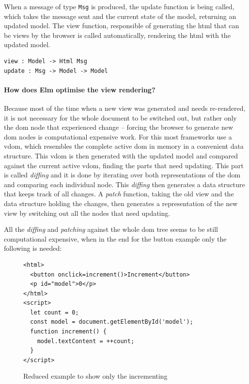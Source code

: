 When a message of type \texttt{Msg} is produced, the update function is being called, which takes the message sent and the current state of the model, returning an updated model. The view function, responsible of generating the \gls{html} that can be views by the browser is called automatically, rendering the \gls{html} with the updated model.

\begin{verbatim}
view : Model -> Html Msg
update : Msg -> Model -> Model
\end{verbatim}

\paragraph{How does Elm optimise the view rendering?}
Because most of the time when a new view was generated and needs re-rendered, it is not necessary for the whole document to be switched out, but rather only the \gls{dom} node that experienced change -- forcing the browser to generate new \gls{dom} nodes is computational expensive work.
For this most frameworks use a \gls{vdom}, which resembles the complete active \gls{dom} in memory in a convenient data structure. This \gls{vdom} is then generated with the updated model and compared against the current active \gls{vdom}, finding the parts that need updating. This part is called \textit{diffing} and it is done by iterating over both representations of the \gls{dom} and comparing each individual node. This \textit{diffing} then generates a data structure that keeps track of all changes. A \textit{patch} function, taking the old view and the data structure holding the changes, then generates a representation of the new view by switching out all the nodes that need updating.

All the \textit{diffing} and \textit{patching} against the whole \gls{dom} tree seems to be still computational expensive, when in the end for the button example only the following is needed:

\begin{figure}[]
    \centering
\begin{verbatim}
<html>
  <button onclick=increment()>Increment</button>
  <p id="model">0</p>
</html>
<script>
  let count = 0;
  const model = document.getElementById('model');
  function increment() {
    model.textContent = ++count;
  }
</script>
\end{verbatim}
    \caption{Reduced example to show only the incrementing}
    \label{fig:button-increment}
\end{figure}

